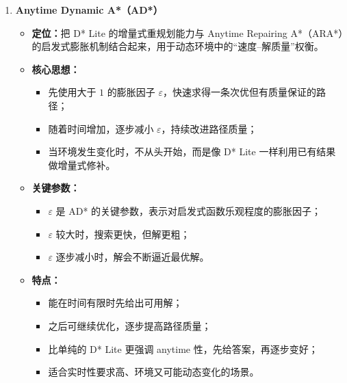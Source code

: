 \documentclass[../main.tex]{subfiles}
\begin{document}
\begin{enumerate}
    \item \textbf{Anytime Dynamic A*（AD*）}
    \begin{itemize}
        \item \textbf{定位：}把 D* Lite 的增量式重规划能力与 Anytime Repairing A*（ARA*）的启发式膨胀机制结合起来，用于动态环境中的“速度--解质量”权衡。
        \item \textbf{核心思想：}
        \begin{itemize}
            \item 先使用大于 $1$ 的膨胀因子 $\varepsilon$，快速求得一条次优但有质量保证的路径；
            \item 随着时间增加，逐步减小 $\varepsilon$，持续改进路径质量；
            \item 当环境发生变化时，不从头开始，而是像 D* Lite 一样利用已有结果做增量式修补。
        \end{itemize}
        \item \textbf{关键参数：}
        \begin{itemize}
            \item $\varepsilon$ 是 AD* 的关键参数，表示对启发式函数乐观程度的膨胀因子；
            \item $\varepsilon$ 较大时，搜索更快，但解更粗；
            \item $\varepsilon$ 逐步减小时，解会不断逼近最优解。
        \end{itemize}
        \item \textbf{特点：}
        \begin{itemize}
            \item 能在时间有限时先给出可用解；
            \item 之后可继续优化，逐步提高路径质量；
            \item 比单纯的 D* Lite 更强调 anytime 性，先给答案，再逐步变好；
            \item 适合实时性要求高、环境又可能动态变化的场景。
        \end{itemize}
    \end{itemize}
\end{enumerate}
\end{document}
